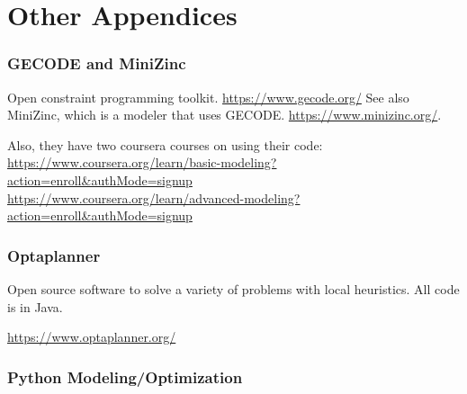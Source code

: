 \documentclass[letter,12pt]{book}
\renewcommand{\0}{\mathbf{0}}
\begin{document}

		 
\part{Other Appendices} %

	


\section{GECODE and MiniZinc}
Open constraint programming toolkit.
\url{https://www.gecode.org/}
See also MiniZinc, which is a modeler that uses GECODE.
\url{https://www.minizinc.org/}.

Also, they have two coursera courses on using their code:
\url{https://www.coursera.org/learn/basic-modeling?action=enroll&authMode=signup}\\
\url{https://www.coursera.org/learn/advanced-modeling?action=enroll&authMode=signup}


\section{Optaplanner}
Open source software to solve a variety of problems with local heuristics.  All code is in Java.  

\url{https://www.optaplanner.org/}
\section{Python Modeling/Optimization}
\end{document}
